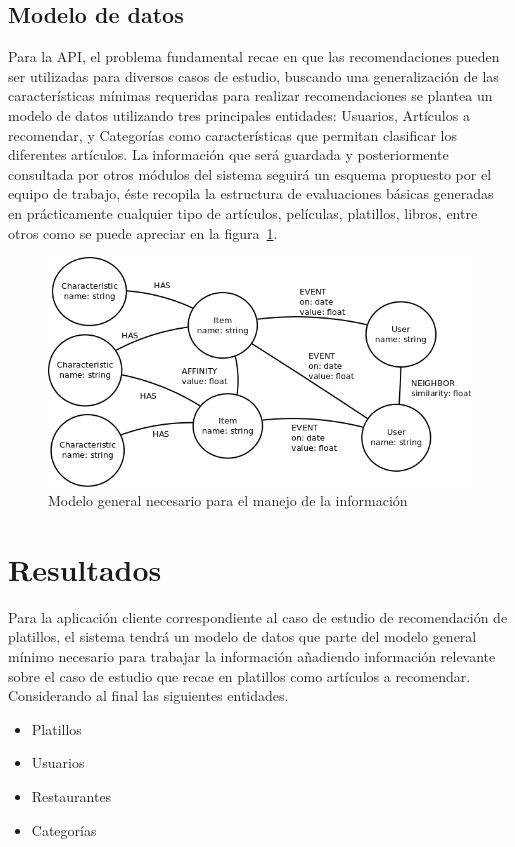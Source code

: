 \subsection{Modelo de datos}
Para la API, el problema fundamental recae en que las recomendaciones pueden ser utilizadas para diversos casos de estudio, buscando una generalización de las características mínimas requeridas para realizar recomendaciones se plantea un modelo de datos utilizando tres principales entidades: Usuarios, Artículos a recomendar, y Categorías como características que permitan clasificar los diferentes artículos. La información que será guardada y posteriormente consultada por otros módulos del sistema seguirá un esquema propuesto por el equipo de trabajo, éste recopila la estructura de evaluaciones básicas generadas en prácticamente cualquier tipo de artículos, películas, platillos, libros, entre otros como se puede apreciar en la figura~\ref{fig:general_model}.

\begin{figure}[h!]
	\centering
	\includegraphics[width=16cm]{./images/general_data_model.png}
	\caption{Modelo general necesario para el manejo de la información}
	\label{fig:general_model}
\end{figure}

      
\section{Resultados}
Para la aplicación cliente correspondiente al caso de estudio de recomendación de platillos, el sistema tendrá un modelo de datos que parte del modelo general mínimo necesario para trabajar la información añadiendo información relevante sobre el caso de estudio que recae en platillos como artículos a recomendar. Considerando al final las siguientes entidades.
\begin{itemize}
	\item Platillos
	\item Usuarios
	\item Restaurantes
	\item Categorías
\end{itemize}

